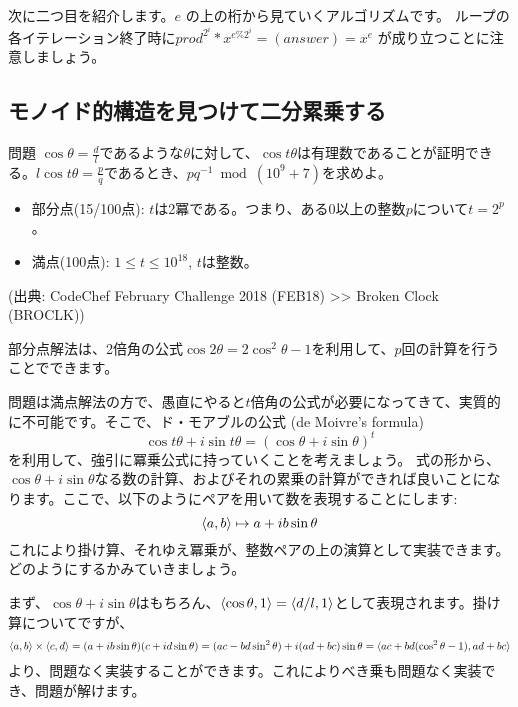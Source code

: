 \documentclass{jsarticle}
\begin{document}
 次に二つ目を紹介します。$e$ の上の桁から見ていくアルゴリズムです。
 ループの各イテレーション終了時に$prod^{2^i} * x^{e \% 2^i} = (answer) = x^e$ が成り立つことに注意しましょう。
 
  \subsection{モノイド的構造を見つけて二分累乗する}
  \begin{itembox}[l]{問題}
   $\cos \theta = \frac{d}{l}$であるような$\theta$に対して、$\cos t\theta$は有理数であることが証明できる。$l\cos t\theta = \frac{p}{q}$であるとき、$pq^{-1} \bmod (10^9+7)$を求めよ。
   \begin{itemize}
    \item 部分点(15/100点): $t$は2冪である。つまり、ある0以上の整数$p$について$t=2^p$。
    \item 満点(100点): $1 \le t \le 10^{18}$, $t$は整数。
   \end{itemize}
   (出典: CodeChef February Challenge 2018 (FEB18) >> Broken Clock (BROCLK))
  \end{itembox}
  部分点解法は、2倍角の公式$\cos 2\theta = 2\cos^2\theta - 1$を利用して、$p$回の計算を行うことでできます。

  問題は満点解法の方で、愚直にやると$t$倍角の公式が必要になってきて、実質的に不可能です。そこで、ド・モアブルの公式 (de Moivre's formula)
  \begin{displaymath}
   \cos t\theta + i\sin t\theta = (\cos\theta + i\sin\theta)^t
  \end{displaymath}
  を利用して、強引に冪乗公式に持っていくことを考えましょう。
  式の形から、$\cos \theta + i\sin\theta$なる数の計算、およびそれの累乗の計算ができれば良いことになります。ここで、以下のようにペアを用いて数を表現することにします:
  \begin{displaymath}
   \langle{a, b}\rangle \mapsto a + ib\sin \theta
  \end{displaymath}
  これにより掛け算、それゆえ冪乗が、整数ペアの上の演算として実装できます。どのようにするかみていきましょう。

  まず、$\cos\theta + i\sin\theta$はもちろん、$\langle{\cos\theta,1}\rangle=\langle{d/l,1}\rangle$として表現されます。掛け算についてですが、
  \begin{displaymath}
   \langle{a, b}\rangle \times \langle{c, d}\rangle = (a+ib\sin\theta)(c+id\sin\theta)
   =(ac-bd\sin^2\theta)+i(ad+bc)\sin\theta
   =\langle{ac+bd(\cos^2\theta-1), ad+bc}\rangle
  \end{displaymath}
  より、問題なく実装することができます。これによりべき乗も問題なく実装でき、問題が解けます。
  
\end{document}
